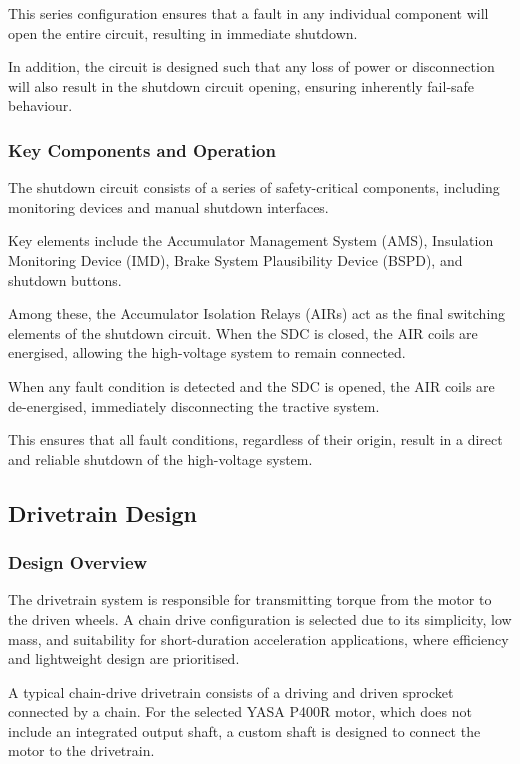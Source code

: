 \documentclass[a4paper,12pt]{article}
\begin{document}
This series configuration ensures that a fault in any individual component will open the entire circuit, resulting in immediate shutdown.

In addition, the circuit is designed such that any loss of power or disconnection will also result in the shutdown circuit opening, ensuring inherently fail-safe behaviour.

\subsubsection{Key Components and Operation}

The shutdown circuit consists of a series of safety-critical components, including monitoring devices and manual shutdown interfaces.

Key elements include the Accumulator Management System (AMS), Insulation Monitoring Device (IMD), Brake System Plausibility Device (BSPD), and shutdown buttons.

Among these, the Accumulator Isolation Relays (AIRs) act as the final switching elements of the shutdown circuit. When the SDC is closed, the AIR coils are energised, allowing the high-voltage system to remain connected.

When any fault condition is detected and the SDC is opened, the AIR coils are de-energised, immediately disconnecting the tractive system.

This ensures that all fault conditions, regardless of their origin, result in a direct and reliable shutdown of the high-voltage system.

\subsection{Drivetrain Design}

\subsubsection{Design Overview}

The drivetrain system is responsible for transmitting torque from the motor to the driven wheels. A chain drive configuration is selected due to its simplicity, low mass, and suitability for short-duration acceleration applications, where efficiency and lightweight design are prioritised.

A typical chain-drive drivetrain consists of a driving and driven sprocket connected by a chain. For the selected YASA P400R motor, which does not include an integrated output shaft, a custom shaft is designed to connect the motor to the drivetrain.
\end{document}
